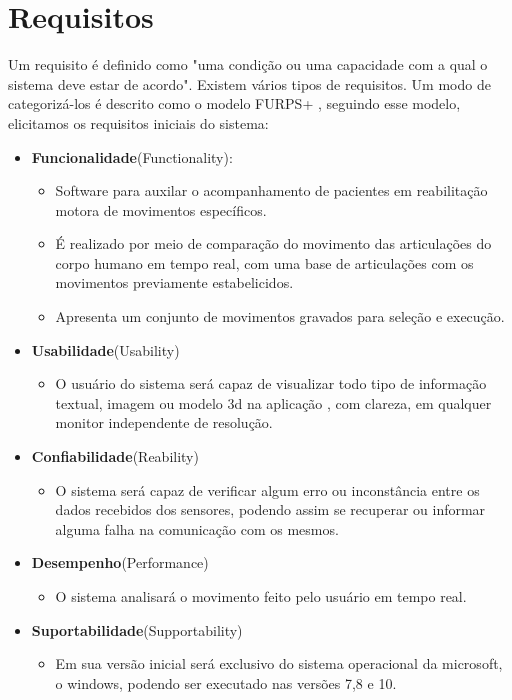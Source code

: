 \section {Requisitos}
\label{Sec:Requisitos}
  Um requisito é definido como "uma condição ou uma capacidade com a qual o
sistema deve estar de acordo"\cite{requisitos}. Existem vários tipos de
requisitos. Um modo de categorizá-los é descrito como o modelo
FURPS+\cite{robertGrady} , seguindo esse modelo, elicitamos os requisitos
iniciais do sistema:
  \begin{itemize}
  \item \textbf{Funcionalidade}(Functionality):
    \begin{itemize}
    \item Software para auxilar o acompanhamento de pacientes em reabilitação
    motora de movimentos específicos.
    \item É realizado por meio de comparação do movimento das articulações do
     corpo humano em tempo real, com uma base de articulações com os movimentos
    previamente estabelicidos.
    \item Apresenta um conjunto de movimentos gravados para seleção e execução.
    \end{itemize}
  \item \textbf{Usabilidade}(Usability)
    \begin{itemize}
    \item O usuário do sistema será capaz de visualizar todo tipo de informação
     textual, imagem ou modelo 3d na aplicação , com clareza, em qualquer
    monitor independente de resolução.
    \end{itemize}
\item \textbf{Confiabilidade}(Reability)
    \begin{itemize}
    \item O sistema será capaz de verificar algum erro ou inconstância entre os
     dados recebidos dos sensores, podendo assim se recuperar ou informar
    alguma falha na comunicação com os mesmos.
    \end{itemize}
\item \textbf{Desempenho}(Performance)
    \begin{itemize}
    \item O sistema analisará o movimento feito pelo usuário em tempo real.
    \end{itemize}
\item \textbf{Suportabilidade}(Supportability)
    \begin{itemize}
    \item Em sua versão inicial será exclusivo do sistema operacional da microsoft, o windows, podendo ser executado nas versões 7,8 e 10.
    \end{itemize}
  \end{itemize}

